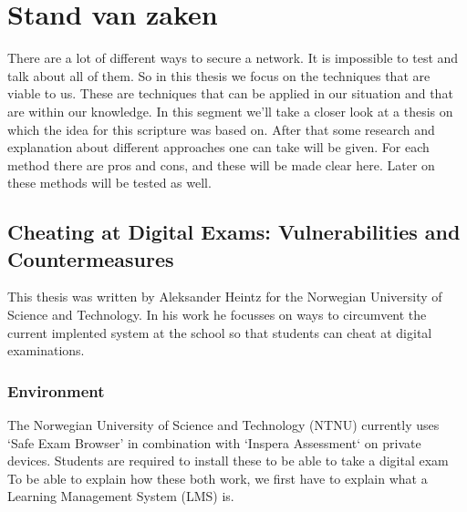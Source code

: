 \chapter{Stand van zaken}
\label{ch:stand-van-zaken}



There are a lot of different ways to secure a network. It is impossible to test and talk about all of them. So in this thesis we focus on the techniques that are viable to us. These are techniques that can be applied in our situation and that are within our knowledge. In this segment we'll take a closer look at a thesis on which the idea for this scripture was based on. After that some research and explanation about different approaches one can take will be given. For each method there are pros and cons, and these will be made clear here. Later on these methods will be tested as well.
\section{Cheating at Digital Exams: Vulnerabilities and Countermeasures}
This thesis was written by Aleksander Heintz for the Norwegian University of Science and Technology. In his work he focusses on ways to circumvent the current implented system at the school so that students can cheat at digital examinations.
\subsection{Environment}
The Norwegian University of Science and Technology (NTNU) currently uses `Safe Exam Browser' in combination with `Inspera Assessment` on private devices. Students are required to install these to be able to take a digital exam
To be able to explain how these both work, we first have to explain what a Learning Management System (LMS) is.

